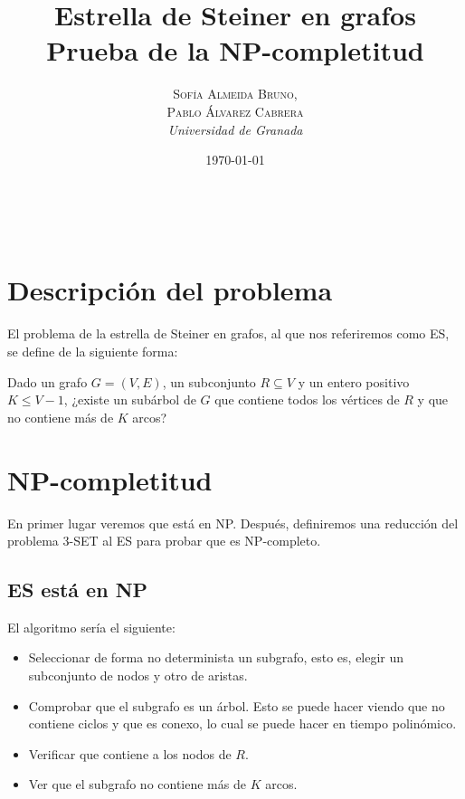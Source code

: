 \documentclass[a4paper, 11pt]{article}
\title{\textbf{Estrella de Steiner en grafos}\\ %
Prueba de la NP-completitud} %
\author{\textsc{Sofía Almeida Bruno,\\Pablo Álvarez Cabrera} %
\\{\textit{Universidad de Granada}}} %
\date{\today} %
\makeatletter
\renewcommand{\maketitle}{
  \begin{flushright} %
  
  {\LARGE\@title} %
  
  \vspace{50pt} %
  
  {\large\@author} %
  \\\@date %
  \vspace{40pt} %
  \end{flushright}
}
\makeatother
\begin{document}
\maketitle %



\section*{Descripción del problema}
El problema de la estrella de Steiner en grafos, al que nos referiremos como ES, se define de la siguiente forma:

Dado un grafo $G=(V,E)$, un subconjunto $R\subseteq V$ y un entero positivo $K \leq V - 1$, ¿existe un subárbol de $G$ que contiene todos los vértices de $R$ y que no contiene más de $K$ arcos?

\section*{NP-completitud}
En primer lugar veremos que está en NP. Después, definiremos una reducción del problema 3-SET al ES para probar que es NP-completo.

\subsection*{ES está en NP}
El algoritmo sería el siguiente:
\begin{itemize}
\item Seleccionar de forma no determinista un subgrafo, esto es, elegir un subconjunto de nodos y otro de aristas.
\item Comprobar que el subgrafo es un árbol. Esto se puede hacer viendo que no contiene ciclos y que es conexo, lo cual se puede hacer en tiempo polinómico.
\item Verificar que contiene a los nodos de $R$.
\item Ver que el subgrafo no contiene más de $K$ arcos.
\end{itemize}
\end{document}
